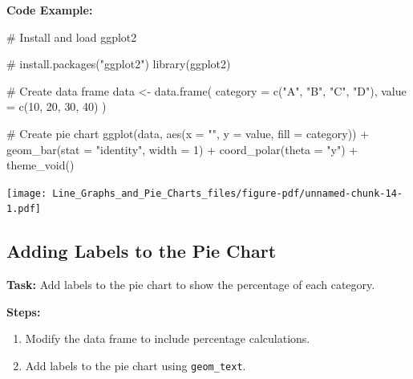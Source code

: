 \documentclass[
  letterpaper,
  DIV=11,
  numbers=noendperiod]{scrreprt}
\newenvironment{Shaded}{\begin{snugshade}}{\end{snugshade}}
\newcommand{\AttributeTok}[1]{\textcolor[rgb]{0.40,0.45,0.13}{#1}}
\newcommand{\CommentTok}[1]{\textcolor[rgb]{0.37,0.37,0.37}{#1}}
\newcommand{\DecValTok}[1]{\textcolor[rgb]{0.68,0.00,0.00}{#1}}
\newcommand{\FunctionTok}[1]{\textcolor[rgb]{0.28,0.35,0.67}{#1}}
\newcommand{\NormalTok}[1]{\textcolor[rgb]{0.00,0.23,0.31}{#1}}
\newcommand{\OtherTok}[1]{\textcolor[rgb]{0.00,0.23,0.31}{#1}}
\newcommand{\SpecialCharTok}[1]{\textcolor[rgb]{0.37,0.37,0.37}{#1}}
\newcommand{\StringTok}[1]{\textcolor[rgb]{0.13,0.47,0.30}{#1}}
\providecommand{\tightlist}{%
  \setlength{\itemsep}{0pt}\setlength{\parskip}{0pt}}\usepackage{longtable,booktabs,array}
\begin{document}
\textbf{Code Example:}

\begin{Shaded}
\begin{Highlighting}[]
\CommentTok{\# Install and load ggplot2}

\CommentTok{\# install.packages("ggplot2")}
\FunctionTok{library}\NormalTok{(ggplot2)}

\CommentTok{\# Create data frame}
\NormalTok{data }\OtherTok{\textless{}{-}} \FunctionTok{data.frame}\NormalTok{(}
  \AttributeTok{category =} \FunctionTok{c}\NormalTok{(}\StringTok{"A"}\NormalTok{, }\StringTok{"B"}\NormalTok{, }\StringTok{"C"}\NormalTok{, }\StringTok{"D"}\NormalTok{),}
  \AttributeTok{value =} \FunctionTok{c}\NormalTok{(}\DecValTok{10}\NormalTok{, }\DecValTok{20}\NormalTok{, }\DecValTok{30}\NormalTok{, }\DecValTok{40}\NormalTok{)}
\NormalTok{)}

\CommentTok{\# Create pie chart}
\FunctionTok{ggplot}\NormalTok{(data, }\FunctionTok{aes}\NormalTok{(}\AttributeTok{x =} \StringTok{""}\NormalTok{, }\AttributeTok{y =}\NormalTok{ value, }\AttributeTok{fill =}\NormalTok{ category)) }\SpecialCharTok{+}
  \FunctionTok{geom\_bar}\NormalTok{(}\AttributeTok{stat =} \StringTok{"identity"}\NormalTok{, }\AttributeTok{width =} \DecValTok{1}\NormalTok{) }\SpecialCharTok{+}
  \FunctionTok{coord\_polar}\NormalTok{(}\AttributeTok{theta =} \StringTok{"y"}\NormalTok{) }\SpecialCharTok{+}
  \FunctionTok{theme\_void}\NormalTok{()}
\end{Highlighting}
\end{Shaded}

\texttt{[image: Line\_Graphs\_and\_Pie\_Charts\_files/figure-pdf/unnamed-chunk-14-1.pdf]}

\subsection*{Adding Labels to the Pie
Chart}\label{adding-labels-to-the-pie-chart}

\textbf{Task:} Add labels to the pie chart to show the percentage of
each category.

\textbf{Steps:}

\begin{enumerate}
\def\labelenumi{\arabic{enumi}.}
\tightlist
\item
  Modify the data frame to include percentage calculations.
\item
  Add labels to the pie chart using \texttt{geom\_text}.
\end{enumerate}
\end{document}
